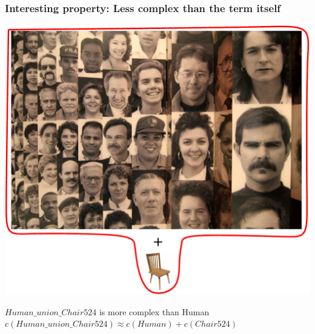 \documentclass{beamer}
\begin{document}
\frame
{
  \frametitle{Interesting property: \alert{Less complex} than the term itself}
  
  \begin{center}
    \includegraphics[scale=0.23]{hc_pic.pdf}
  \end{center}

  \begin{beamerboxesrounded}{$Human\_union\_Chair524$ is
      \alert{more complex} than Human}
    $c(Human\_union\_Chair524) \approx c(Human) + c(Chair524)$
  \end{beamerboxesrounded}
}
\end{document}
